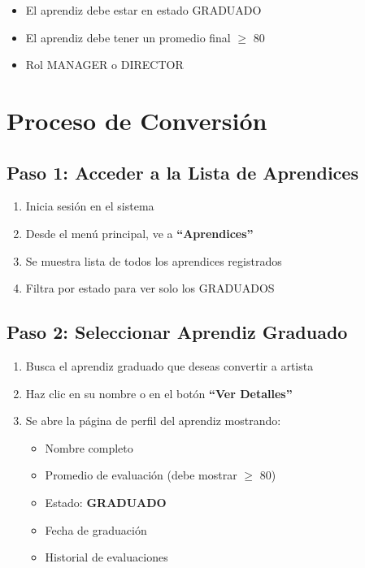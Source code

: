\documentclass[12pt,a4paper,spanish,oneside]{report}
\begin{document}
\begin{itemize}
\item El aprendiz debe estar en estado GRADUADO
\item El aprendiz debe tener un promedio final $\geq$ 80
\item Rol MANAGER o DIRECTOR
\end{itemize}

\section{Proceso de Conversión}

\subsection{Paso 1: Acceder a la Lista de Aprendices}

\begin{enumerate}
\item Inicia sesión en el sistema
\item Desde el menú principal, ve a \textbf{``Aprendices''}
\item Se muestra lista de todos los aprendices registrados
\item Filtra por estado para ver solo los GRADUADOS
\end{enumerate}

\subsection{Paso 2: Seleccionar Aprendiz Graduado}

\begin{enumerate}
\item Busca el aprendiz graduado que deseas convertir a artista
\item Haz clic en su nombre o en el botón \textbf{``Ver Detalles''}
\item Se abre la página de perfil del aprendiz mostrando:
\begin{itemize}
\item Nombre completo
\item Promedio de evaluación (debe mostrar $\geq$ 80)
\item Estado: \textbf{GRADUADO}
\item Fecha de graduación
\item Historial de evaluaciones
\end{itemize}
\end{enumerate}
\end{document}
